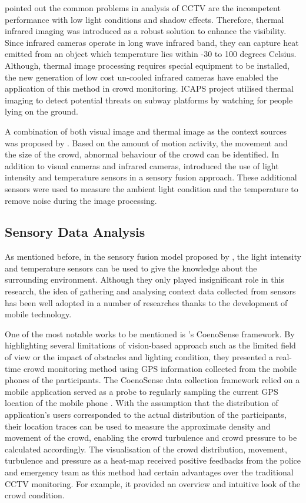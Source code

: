 \citet{Andersson2009} pointed out the common problems in analysis of CCTV are the incompetent performance with low light conditions and shadow effects. Therefore, thermal infrared imaging was introduced as a robust solution to enhance the visibility. Since infrared cameras operate in long wave infrared band, they can capture heat emitted from an object which temperature lies within -30 to 100 degrees Celsius. Although, thermal image processing requires special equipment to be installed, the new generation of low cost un-cooled infrared cameras have enabled the application of this method in crowd monitoring. ICAPS project \citep{Pham2007} utilised thermal imaging to detect potential threats on subway platforms by watching for people lying on the ground.

A combination of both visual image and thermal image as the context sources was proposed by \citet{Andersson2009}. Based on the amount of motion activity, the movement and the size of the crowd, abnormal behaviour of the crowd can be identified. In addition to visual cameras and infrared cameras, \citet{Yaseen2013} introduced the use of light intensity and temperature sensors in a sensory fusion approach. These additional sensors were used to measure the ambient light condition and the temperature to remove noise during the image processing.

\subsection{Sensory Data Analysis}
As mentioned before, in the sensory fusion model proposed by \citet{Yaseen2013}, the light intensity and temperature sensors can be used to give the knowledge about the surrounding environment. Although they only played insignificant role in this research, the idea of gathering and analysing context data collected from sensors has been well adopted in a number of researches thanks to the development of mobile technology.

One of the most notable works to be mentioned is \citet{Wirz2012}’s CoenoSense framework. By highlighting several limitations of vision-based approach such as the limited field of view or the impact of obstacles and lighting condition, they presented a real-time crowd monitoring method using GPS information collected from the mobile phones of the participants. The CoenoSense data collection framework relied on a mobile application served as a probe to regularly sampling the current GPS location of the mobile phone \citep{Wirz2013}. With the assumption that the distribution of application's users corresponded to the actual distribution of the participants, their location traces can be used to measure the approximate density and movement of the crowd, enabling the crowd turbulence and crowd pressure to be calculated accordingly. The visualisation of the crowd distribution, movement, turbulence and pressure as a heat-map received positive feedbacks from the police and emergency team as this method had certain advantages over the traditional CCTV monitoring. For example, it provided an overview and intuitive look of the crowd condition.

